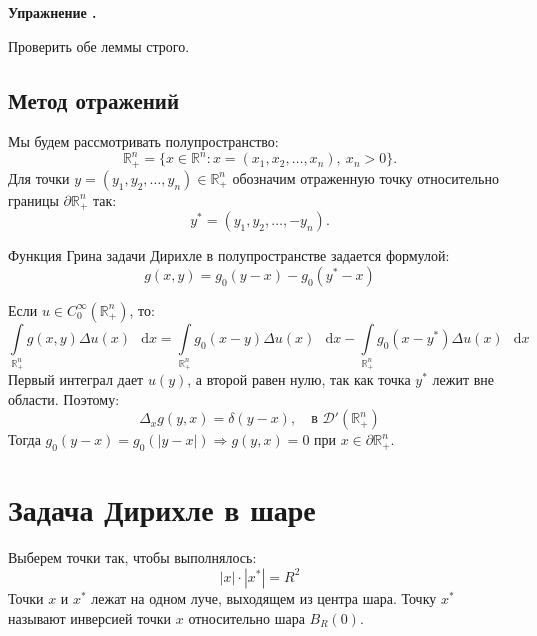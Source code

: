 \documentclass[11pt,a4paper]{report}
\numberwithin{equation}{section}
\numberwithin{figure}{chapter}
\numberwithin{table}{chapter}
\newif\ifinmathphysstatement
\newenvironment{myexe}[1][]{%
    \refstepcounter{exectr}%
    \inmathphysstatementtrue
    \begin{tcolorbox}[mathphysblock,colframe=exercisecolor,colback=exercisecolor!3,#1]
    \textbf{\color{exercisecolor}Упражнение \theexectr.}\par\smallskip
}{%
    \end{tcolorbox}
    \inmathphysstatementfalse
}
\newcommand{\R}{\mathbb{R}}
\newcommand{\D}{\mathcal{D}}
\newcommand{\p}{\partial}
\newcommand{\dd}{\mathop{}\!\mathrm{d}}
\begin{document}
\begin{myexe}
Проверить обе леммы строго.
\end{myexe}

\subsection{Метод отражений}

Мы будем рассмотривать полупространство:
\[
    \R^n_+=\{x\in\R^n:
    x=(x_1,x_2,\ldots,x_n),\ x_n>0\}.
\]
Для точки $y=(y_1,y_2,\ldots,y_n)\in\R^n_+$ обозначим отраженную точку относительно границы $\p\R^n_+$ так:
\[
    y^*=(y_1,y_2,\ldots,-y_n).
\]


Функция Грина задачи Дирихле в полупространстве задается формулой:
\[
    g(x,y)=g_0(y-x)-g_0(y^*-x)
\]

\begin{figure}[H]
\centering
{}
\end{figure}


Если $u\in C_0^\infty(\R^n_+)$, то:
\[
    \int\limits_{\R^n_+} g(x,y)\Delta u(x)\,\dd x
    =
    \int\limits_{\R^n_+}g_0(x-y)\Delta u(x)\,\dd x
    -
    \int\limits_{\R^n_+}g_0(x-y^*)\Delta u(x)\,\dd x
\]
Первый интеграл дает $u(y)$, а второй равен нулю, так как точка $y^*$ лежит вне области. Поэтому:
\[
    \Delta_x g(y,x)=\delta(y-x),\quad \text{в } \D'(\R^n_+)
\]
Тогда $g_0(y-x)=g_0(|y-x|)\Rightarrow g(y,x)=0$ при $x\in \p \R^n_+$.

\section{Задача Дирихле в шаре}

Выберем точки так, чтобы выполнялось:
\[|x|\cdot|x^*|=R^2\]
Точки $x$ и $x^*$ лежат на одном луче, выходящем из центра шара. Точку $x^*$ называют инверсией точки $x$ относительно шара $B_R(0).$
\end{document}
